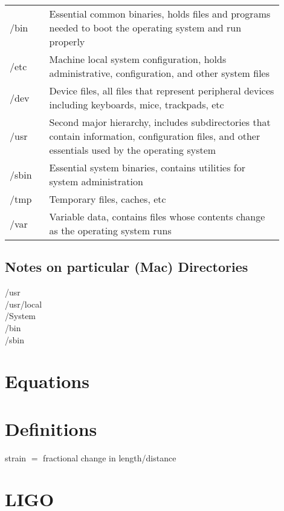 \documentclass[11pt]{article}
\begin{document}
\begin{table}[h!]
\begin{center}
\begin{tabular}{p{0.13\linewidth}p{0.77\linewidth}}
      /bin &	Essential common binaries, holds files and programs needed to boot the operating system and run properly\\
      /etc &	Machine local system configuration, holds administrative, configuration, and other system files\\
      /dev &	Device files, all files that represent peripheral devices including keyboards, mice, trackpads, etc\\
      /usr &	Second major hierarchy, includes subdirectories that contain information, configuration files, and other essentials used by the operating system\\
      /sbin &	Essential system binaries, contains utilities for system administration\\
      /tmp &	Temporary files, caches, etc\\
      /var &	Variable data, contains files whose contents change as the operating system runs\\
      \hline
      \hline
   \end{tabular}
  \end{center}
\end{table}


\subsection{Notes on particular (Mac) Directories}      
/usr \\
/usr/local \\
/System \\
/bin  \\
/sbin \\


\section{Equations}


\section{Definitions}
strain $=$ fractional change in length/distance\\


\section{LIGO}
\end{document}
